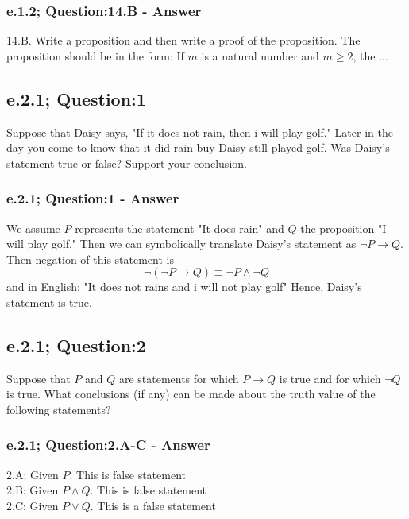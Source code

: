 \subsubsection*{e.1.2; Question:14.B - Answer}
14.B. Write a proposition and then write a proof of the proposition. The proposition should be in the form: If $m$ is a natural number and $m \ge 2$, the ... \\


\subsection{e.2.1; Question:1}
Suppose that Daisy says, "If it does not rain, then i will play golf." Later in the day you come to know that it did rain buy Daisy still played golf. Was Daisy's statement true or  false? Support your conclusion. \\


\subsubsection*{e.2.1; Question:1 - Answer}
We assume $P$ represents the statement "It does rain" and $Q$ the proposition "I will play golf." Then we can symbolically translate Daisy's statement as $\neg P \to Q$. Then negation of this statement is \[ \neg (\neg P \to Q) \equiv \neg P \wedge \neg Q \] and in English: "It does not rains and i will not play golf" Hence, Daisy's statement is true. \\



\subsection{e.2.1; Question:2}
Suppose that $P$ and $Q$ are statements for which $P \to Q$ is true and for which $\neg Q$ is true. What conclusions (if any) can be made about the truth value of the following statements?  \\

\subsubsection*{e.2.1; Question:2.A-C - Answer}
2.A: Given $P$. This is false statement \\
2.B: Given $P \wedge Q$. This is false statement \\
2.C: Given $P \vee Q$. This is a false statement \\


